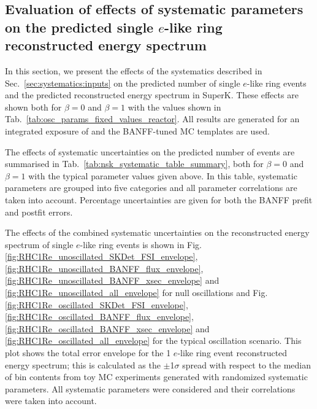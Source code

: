 \afterpage{}


\clearpage

\subsection {Evaluation of effects of systematic parameters on the predicted single $e$-like ring reconstructed energy spectrum}
\label{sec:systematics:evaluation}

In this section, we present the effects of the systematics described in Sec.~\ref{sec:systematics:inputs}
on the predicted number of single $e$-like ring events and the predicted reconstructed energy spectrum in SuperK.
These effects are shown both 
for $\beta=0$ and $\beta=1$
with the values shown in Tab.~\ref{tab:osc_params_fixed_values_reactor}.
All results are generated for an integrated exposure of \TotalPot and
the BANFF-tuned MC templates are used.

The effects of systematic uncertainties on the predicted number of events are summarised in Tab.~\ref{tab:nsk_systematic_table_summary}, 
both for 
$\beta=0$ and $\beta=1$
with the typical parameter values given above.
In this table, systematic parameters are grouped into five categories and all parameter correlations are taken into account.
Percentage uncertainties are given for both the BANFF prefit and postfit errors.

The effects of the combined systematic uncertainties on the reconstructed energy spectrum of single $e$-like ring events
is shown in Fig.
\ref{fig:RHC1Re_unoscillated_SKDet_FSI_envelope},
\ref{fig:RHC1Re_unoscillated_BANFF_flux_envelope}, 
\ref{fig:RHC1Re_unoscillated_BANFF_xsec_envelope} and 
\ref{fig:RHC1Re_unoscillated_all_envelope}
for null oscillations
and Fig.
\ref{fig:RHC1Re_oscillated_SKDet_FSI_envelope},
\ref{fig:RHC1Re_oscillated_BANFF_flux_envelope}, 
\ref{fig:RHC1Re_oscillated_BANFF_xsec_envelope} and 
\ref{fig:RHC1Re_oscillated_all_envelope}
for the typical oscillation scenario.
This plot shows the total error envelope for the 1 $e$-like ring event reconstructed energy spectrum; this is calculated
as the $\pm$1$\sigma$ spread with respect to the median of bin contents from \NumToys toy MC experiments generated with randomized systematic parameters.
All systematic parameters were considered and their correlations were taken
into account.

